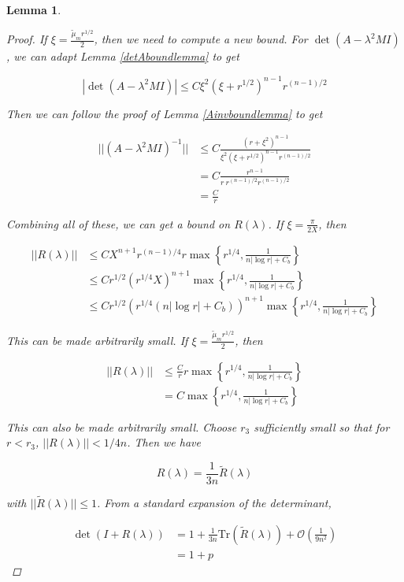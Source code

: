 \documentclass[12pt]{article}
\newtheorem{lemma}{Lemma}
\begin{document}
\begin{lemma}
\begin{proof}
If $\xi = \frac{\tilde{\mu}_m r^{1/2}}{2}$, then we need to compute a new bound. For $\det(A - \lambda^2 MI)$, we can adapt Lemma \ref{detAboundlemma} to get

\[
|\det(A - \lambda^2 MI)| \leq C \xi^2 (\xi + r^{1/2})^{n-1} r^{(n-1)/2}
\]

Then we can follow the proof of Lemma \ref{Ainvboundlemma} to get

\begin{align*}
||(A - \lambda^2 MI)^{-1}|| &\leq C \frac{(r + \xi^2)^{n-1}}{\xi^2 (\xi + r^{1/2})^{n-1} r^{(n-1)/2}} \\
&= C \frac{r^{n-1}}{r \: r^{(n-1)/2} r^{(n-1)/2}} \\
&= \frac{C}{r} 
\end{align*}

Combining all of these, we can get a bound on $R(\lambda)$. If $\xi = \frac{\pi}{2X}$, then

\begin{align*}
||R(\lambda)|| &\leq C X^{n+1} r^{(n-1)/4} r \max\left\{ r^{1/4}, \frac{1}{n|\log r| + C_b } \right\} \\
&\leq C r^{1/2} (r^{1/4} X)^{n+1} \max\left\{ r^{1/4}, \frac{1}{n|\log r| + C_b } \right\} \\
&\leq C r^{1/2} \left(r^{1/4}(n|\log r| + C_b)\right)^{n+1} \max\left\{ r^{1/4}, \frac{1}{n|\log r| + C_b } \right\}
\end{align*}

This can be made arbitrarily small. If $\xi = \frac{\tilde{\mu}_m r^{1/2}}{2}$, then 

\begin{align*}
||R(\lambda)|| &\leq \frac{C}{r} r \max\left\{ r^{1/4}, \frac{1}{n|\log r| + C_b} \right\} \\
&= C \max\left\{ r^{1/4}, \frac{1}{n|\log r| + C_b} \right\} 
\end{align*}

This can also be made arbitrarily small. Choose $r_3$ sufficiently small so that for $r < r_3$, $||R(\lambda)|| < 1/4n$. Then we have

\[
R(\lambda) = \frac{1}{3n}\tilde{R}(\lambda)
\] 

with $||\tilde{R}(\lambda)|| \leq 1$. From a standard expansion of the determinant, 

\begin{align*}
\det(I + R(\lambda)) &= 1 + \frac{1}{3n} \text{Tr}(\tilde{R}(\lambda)) + \mathcal{O}\left(\frac{1}{9n^2} \right) \\
&= 1 + p
\end{align*}


\end{proof}
\end{lemma}
\end{document}
